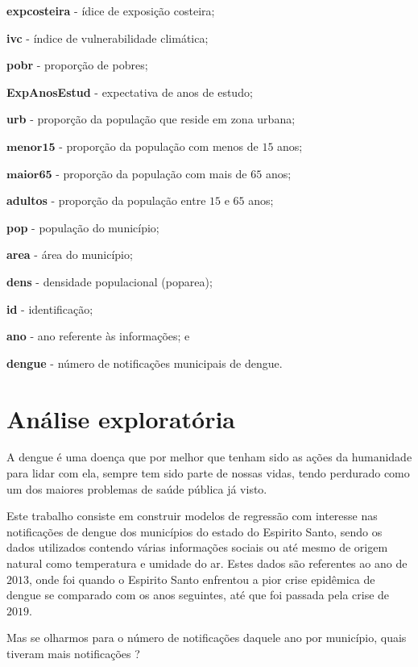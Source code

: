 \documentclass[12pt,a4paper]{article}\usepackage[]{graphicx}\usepackage[]{color}
\begin{document}
\noindent
\textbf{expcosteira} - ídice de exposição costeira;

\noindent
\textbf{ivc} - índice de vulnerabilidade climática;

\noindent
\textbf{pobr} - proporção de pobres;

\noindent
\textbf{ExpAnosEstud} - expectativa de anos de estudo;

\noindent
\textbf{urb} - proporção da população que reside em zona urbana;

\noindent
$\mathbf{menor15}$ - proporção da população com menos de $15$ anos;

\noindent
$\mathbf{maior65}$ - proporção da população com mais de $65$ anos;

\noindent
\textbf{adultos} - proporção da população entre $15$ e $65$ anos;

\noindent
\textbf{pop} - população do município;

\noindent
\textbf{area} - área do município;

\noindent
\textbf{dens} - densidade populacional (pop\/area);

\noindent
\textbf{id} - identificação;

\noindent
\textbf{ano} - ano referente às informações; e

\noindent
\textbf{dengue} - número de notificações municipais de dengue.


\newpage
\section{{\LARGE\textbf{Análise exploratória}}}

A dengue é uma doença que por melhor que tenham sido as ações da humanidade para lidar com ela, sempre tem sido parte de nossas vidas, tendo perdurado como um dos maiores problemas de saúde pública já visto.

Este trabalho consiste em construir modelos de regressão com interesse nas notificações de dengue dos municípios do estado do Espirito Santo, sendo os dados utilizados contendo várias informações sociais ou até mesmo de origem natural como temperatura e umidade do ar. Estes dados são referentes ao ano de $2013$, onde foi quando o Espirito Santo enfrentou a pior crise epidêmica de dengue se comparado com os anos seguintes, até que foi passada pela crise de $2019$.

\newpage
Mas se olharmos para o número de notificações daquele ano por município, quais tiveram mais notificações ? 
\end{document}
